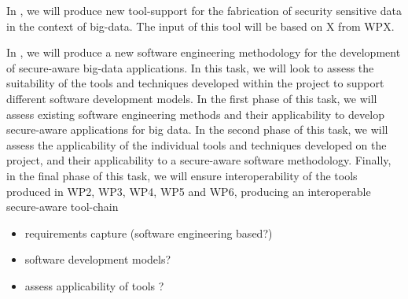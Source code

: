 \begin{Workpackage}{\thewpno}
\begin{Task}
	\TaskResults{%
	}
	\TaskHeader{}
	
	In \theTask, we will produce new tool-support for the fabrication of security sensitive data in the context of big-data. The input of this tool will be based on X from WPX. 
\end{Task}

\begin{Task}
	
	\TaskResults{%
	}
	\TaskHeader{}
	
	In \theTask, we will produce a new software engineering methodology for the development of secure-aware big-data applications. In this task, we will look to assess the suitability of the tools and techniques developed within the project to support different software development models. 
	In the first phase of this task, we will assess existing  software engineering methods and their applicability to develop secure-aware applications for big data.
	In the second phase of this task, we will assess the applicability of the individual tools and techniques developed on the \TheProject{} project, and their applicability to a secure-aware software methodology. 
	Finally, in the final phase of this task, we will ensure interoperability of the tools produced in WP2, WP3, WP4, WP5 and WP6, producing an interoperable secure-aware tool-chain
	\begin{itemize}
		\item requirements capture (software engineering based?)
		\item software development models?
		\item assess applicability of tools ?
	\end{itemize}
\end{Task}


\begin{Task}
	
	\TaskResults{%
	}
	\TaskHeader{}
	

\end{Task}
\end{Workpackage}
